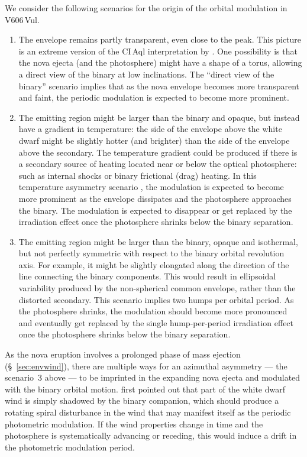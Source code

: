 \documentclass[twocolumn]{aastex631}
\newcommand{\nova}{V606\,Vul}
\begin{document}
We consider the following scenarios for the origin of the orbital modulation
in \nova{}.
\begin{enumerate}
\item The envelope remains partly transparent, even close to the peak. 
This picture is an extreme version of the CI\,Aql interpretation by
\cite{2011ApJ...742..112S}. One possibility is that the nova ejecta 
(and the photosphere) might have a shape of a torus, allowing a direct view of 
the binary at low inclinations.
The ``direct view of the binary'' scenario implies that as the nova envelope
becomes more transparent and faint, the periodic modulation 
is expected to become more prominent. 
\item The emitting region might be larger than the binary and opaque, 
but instead have a gradient in temperature: 
the side of the envelope above the white dwarf might be slightly hotter
(and brighter) than the side of the envelope above the secondary.
%
The temperature gradient could be produced if there is a secondary source of 
heating located near or below the optical photosphere:  
such as internal shocks or binary frictional (drag) heating. 
% 
In this temperature asymmetry scenario \citep[discussed by][in application to V723\,Cas]{2002ASPC..261..625G}, 
the modulation is expected to become more prominent as the envelope dissipates 
and the photosphere approaches the binary. The modulation 
is expected to disappear or get replaced by the irradiation effect once the photosphere shrinks below the binary separation.
\item The emitting region might be larger than the binary, opaque and
isothermal, but not perfectly symmetric with respect to the binary orbital revolution axis. 
For example, it might be slightly elongated along the direction of the line
connecting the binary components. 
This would result in ellipsoidal variability produced by the
non-spherical common envelope, rather than the distorted secondary.
This scenario implies two humps per orbital period. As the photosphere
shrinks, the modulation should become more pronounced and eventually get
replaced by the single hump-per-period irradiation effect once the
photosphere shrinks below the binary separation.
\end{enumerate}

As the nova eruption involves a prolonged phase of mass ejection (\S~\ref{sec:envwind}),
there are multiple ways for an azimuthal asymmetry --- the scenario~3 above --- 
to be imprinted in the expanding nova ejecta and modulated with the binary orbital motion.
\cite{1977MNRAS.180..749F} first pointed out that part of the white dwarf
wind is simply shadowed by the binary companion, which should produce 
a rotating spiral disturbance in the wind that may manifest itself as the periodic
photometric modulation. If the wind properties change in time and the
photosphere is systematically advancing or receding, this would induce a
drift in the photometric modulation period.
\end{document}
